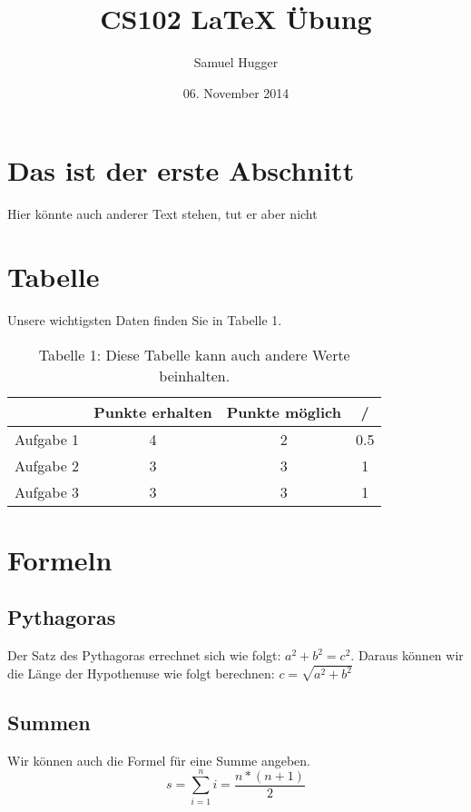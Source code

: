 \documentclass[11pt,a4paper]{article}
\title{CS102 LaTeX Übung}
\date{06. November 2014}
\author{Samuel Hugger}
\begin{document}
\maketitle
\section{Das ist der erste Abschnitt}

Hier könnte auch anderer Text stehen, tut er aber nicht

\section{Tabelle}
Unsere wichtigsten Daten finden Sie in Tabelle 1.
\begin{table}[htbp]
\centering
\begin{tabular}{c|c|c|c}
& Punkte erhalten & Punkte möglich & / \\
\hline
Aufgabe 1 & 4 & 2 & 0.5 \\
Aufgabe 2 & 3 & 3 & 1 \\
Aufgabe 3 & 3 & 3 & 1 \\
\end{tabular}
\caption{Tabelle 1: Diese Tabelle kann auch andere Werte beinhalten.}
\end{table}
\section{Formeln}
\subsection{Pythagoras}

Der Satz des Pythagoras errechnet sich wie folgt: $a^2+b^2=c^2$. Daraus können wir die Länge der Hypothenuse wie folgt berechnen: $c = \sqrt{a^2 + b^2}$
\subsection{Summen}

Wir können auch die Formel für eine Summe angeben.
\begin{equation}
s=\sum\limits_{i=1}^{n}i=\frac{n*(n+1)}{2}
\end{equation}
\end{document}
